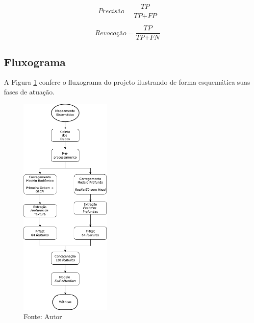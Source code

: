 \begin{equation}
\textit{Precisão} = \frac{\textit{TP}}{\textit{TP} + \textit{FP}}
\label{eq:precision}
\end{equation}

\begin{equation}
\textit{Revocação} = \frac{\textit{TP}}{\textit{TP} + \textit{FN}}
\label{eq:recall}
\end{equation}



\subsection{Fluxograma}
\label{subsec:cap4_floxugrama}

A Figura \ref{fig:fig015} confere o fluxograma do projeto ilustrando de forma esquemática suas fases de atuação.

\begin{figure}[htbp]
    \centering
    \includegraphics[width=0.4\textwidth]{figures/fig015.png}
    \caption{Fonte: Autor}
    \label{fig:fig015}
\end{figure}

